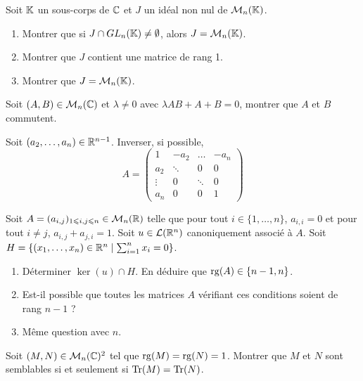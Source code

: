 \documentclass[12pt]{article}
\begin{document}
\begin{exercise}
	Soit $\mathbb{K}$ un sous-corps de $\mathbb{C}$ et $J$ un idéal non nul de $\mathcal{M}_{n}(\mathbb{K})$.
	\begin{enumerate}
		\item
		Montrer que si $J\cap GL_{n}(\mathbb{K})\neq\emptyset$, alors $J=\mathcal{M}_{n}(\mathbb{K})$.
		\item
		Montrer que $J$ contient une matrice de rang 1.
		\item
		Montrer que $J=\mathcal{M}_{n}(\mathbb{K})$.
	\end{enumerate}
\end{exercise}

\begin{exercise}
	Soit $(A,B)\in\mathcal{M}_{n}(\mathbb{C})$ et $\lambda\neq 0$ avec $\lambda AB+A+B=0$, montrer
	que $A$ et $B$ commutent.
\end{exercise}

\begin{exercise}
	Soit $(a_{2},\dots,a_{n})\in\mathbb{R}^{n-1}$. Inverser, si possible,
	$$
	A=
	\begin{pmatrix}
		1 		& -a_{2}	& \dots		& -a_{n}\\
		a_{2} 	& \ddots 	& 0			& 0\\
		\vdots 	& 0			& \ddots 	& 0\\
		a_{n}	& 0			& 0			& 1
	\end{pmatrix}
	$$
\end{exercise}

\begin{exercise}
	Soit $A=(a_{i,j})_{1\leqslant i,j\leqslant n}\in\mathcal{M}_{n}(\mathbb{R})$ telle que pour
	tout $i\in\{1,\dots,n\}$, $a_{i,i}=0$ et pour tout $i\neq j$,
	$a_{i,j}+a_{j,i}=1$. Soit $u\in\mathcal{L}(\mathbb{R}^{n})$ canoniquement associé à $A$. Soit
	$H=\{(x_{1},\dots,x_{n})\in\mathbb{R}^{n}\mid\sum_{i=1}^{n}x_{i}=0\}$.
	\begin{enumerate}
		\item
		Déterminer $\ker(u)\cap H$. En déduire que $\operatorname{rg}(A)\in\{n-1,n\}$.
		\item
		Est-il possible que toutes les matrices $A$ vérifiant ces conditions
		soient de rang $n-1$ ?
		\item
		Même question avec $n$.
	\end{enumerate}
\end{exercise}

\begin{exercise}
	Soit $(M,N)\in\mathcal{M}_{n}(\mathbb{C})^{2}$ tel que $\operatorname{rg}(M)=\operatorname{rg}(N)=1$. Montrer que $M$ et
	$N$ sont semblables si et seulement si $\operatorname{Tr}(M)=\operatorname{Tr}(N)$.
\end{exercise}
\end{document}
